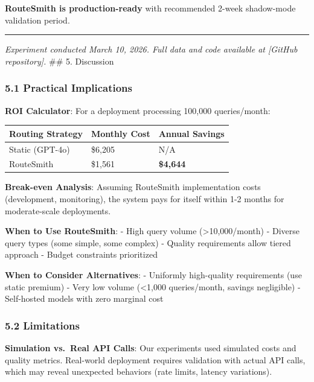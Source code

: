 \documentclass[
]{article}
\begin{document}
\textbf{RouteSmith is production-ready} with recommended 2-week
shadow-mode validation period.

\begin{center}\rule{0.5\linewidth}{0.5pt}\end{center}

\emph{Experiment conducted March 10, 2026. Full data and code available
at {[}GitHub repository{]}.} \#\# 5. Discussion

\hypertarget{practical-implications}{%
\subsubsection{5.1 Practical
Implications}\label{practical-implications}}

\textbf{ROI Calculator}: For a deployment processing 100,000
queries/month:

\begin{longtable}[]{@{}lll@{}}
\toprule
Routing Strategy & Monthly Cost & Annual Savings \\
\midrule
\endhead
Static (GPT-4o) & \$6,205 & N/A \\
RouteSmith & \$1,561 & \textbf{\$4,644} \\
\bottomrule
\end{longtable}

\textbf{Break-even Analysis}: Assuming RouteSmith implementation costs
(development, monitoring), the system pays for itself within 1-2 months
for moderate-scale deployments.

\textbf{When to Use RouteSmith}: - High query volume
(\textgreater10,000/month) - Diverse query types (some simple, some
complex) - Quality requirements allow tiered approach - Budget
constraints prioritized

\textbf{When to Consider Alternatives}: - Uniformly high-quality
requirements (use static premium) - Very low volume (\textless1,000
queries/month, savings negligible) - Self-hosted models with zero
marginal cost

\hypertarget{limitations-1}{%
\subsubsection{5.2 Limitations}\label{limitations-1}}

\textbf{Simulation vs.~Real API Calls}: Our experiments used simulated
costs and quality metrics. Real-world deployment requires validation
with actual API calls, which may reveal unexpected behaviors (rate
limits, latency variations).
\end{document}
